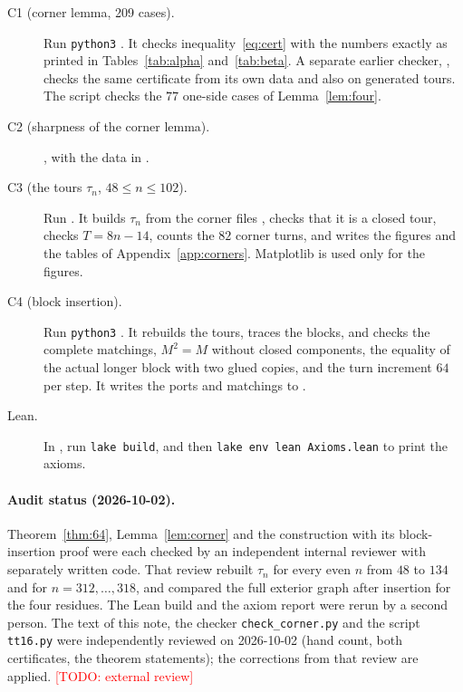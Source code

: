 \documentclass[11pt]{article}
\theoremstyle{definition}
\theoremstyle{remark}
\newcommand{\todo}[1]{\textcolor{red}{[TODO: #1]}}
\begin{document}
\begin{description}
\item[C1 (corner lemma, 209 cases).] Run \texttt{python3} . It checks inequality~\eqref{eq:cert} with the numbers exactly as printed in Tables~\ref{tab:alpha} and~\ref{tab:beta}. A separate earlier checker, , checks the same certificate from its own data and also on generated tours. The script  checks the $77$ one-side cases of Lemma~\ref{lem:four}.
\item[C2 (sharpness of the corner lemma).] , with the data in .
\item[C3 (the tours $\tau_n$, $48\le n\le102$).] Run  . It builds $\tau_n$ from the corner files , checks that it is a closed tour, checks $T=8n-14$, counts the $82$ corner turns, and writes the figures and the tables of Appendix~\ref{app:corners}. Matplotlib is used only for the figures.
\item[C4 (block insertion).] Run \texttt{python3} . It rebuilds the tours, traces the blocks, and checks the complete matchings, $M^2=M$ without closed components, the equality of the actual longer block with two glued copies, and the turn increment $64$ per step. It writes the ports and matchings to .
\item[Lean.] In , run \texttt{lake build}, and then \texttt{lake env lean Axioms.lean} to print the axioms.
\end{description}

\paragraph{Audit status (2026-10-02).}
Theorem~\ref{thm:64}, Lemma~\ref{lem:corner} and the construction with its block-insertion proof were each checked by an independent internal reviewer with separately written code.
That review rebuilt $\tau_n$ for every even $n$ from $48$ to $134$ and for $n=312,\dots,318$, and compared the full exterior graph after insertion for the four residues.
The Lean build and the axiom report were rerun by a second person.
The text of this note, the checker \texttt{check\_corner.py} and the script \texttt{tt16.py} were independently reviewed on 2026-10-02 (hand count, both certificates, the theorem statements); the corrections from that review are applied.
\todo{external review}
\end{document}
